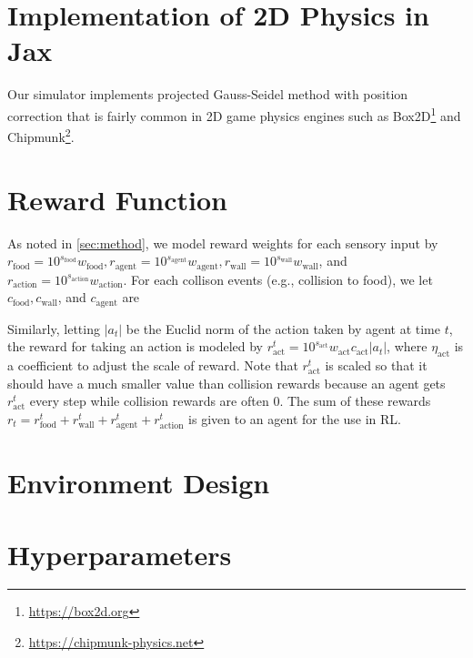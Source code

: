 \section{Implementation of 2D Physics in Jax}\label{ap:phys}
Our simulator implements projected Gauss-Seidel method with position correction \citep{catto2005iterative} that is fairly common in 2D game physics engines such as Box2D\footnote{\url{https://box2d.org}} and Chipmunk\footnote{\url{https://chipmunk-physics.net}}.

\section{Reward Function}\label{ap:reward}
As noted in \cref{sec:method}, we model reward weights for each sensory input by $r_{\mathrm{food}} = 10^{s_{\mathrm{food}}} w_{\mathrm{food}}, r_{\mathrm{agent}} = 10^{s_{\mathrm{agent}}} w_{\mathrm{agent}}, r_{\mathrm{wall}} = 10^{s_{\mathrm{wall}}} w_{\mathrm{wall}}$, and $r_{\mathrm{action}} = 10^{s_{\mathrm{action}}} w_{\mathrm{action}}$. For each collison events (e.g., collision to food), we let $c_{\mathrm{food}}, c_{\mathrm{wall}}$, and $c_{\mathrm{agent}}$ are

Similarly, letting $|a_t|$ be the Euclid norm of the action taken by agent at time $t$, the reward for taking an action is modeled by $r_{\mathrm{act}}^{t} = 10^{s_{\mathrm{act}}} w_{\mathrm{act}} c_\mathrm{act} |a_t|$, where $\eta_\mathrm{act}$ is a coefficient to adjust the scale of reward. Note that $r_{\mathrm{act}}^{t}$ is scaled so that it should have a much smaller value than collision rewards because an agent gets $r_{\mathrm{act}}^{t}$ every step while collision rewards are often $0$. The sum of these rewards $r_t = r_{\mathrm{food}}^{t} + r_{\mathrm{wall}}^{t} + r_{\mathrm{agent}}^{t} + r_{\mathrm{action}}^{t}$ is given to an agent for the use in RL.

\section{Environment Design}\label{ap:env}

\section{Hyperparameters}\label{ap:param}

